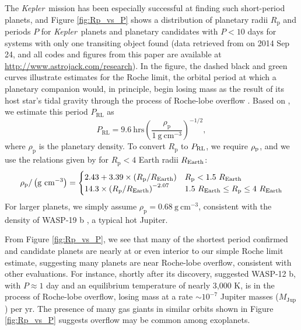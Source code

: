 \documentclass{aastex}
\newcommand{\kepler}{{\it Kepler}}
\begin{document}
The \kepler\ mission has been especially successful at finding such short-period planets, and Figure \ref{fig:Rp_vs_P} shows a distribution of planetary radii $R_\mathrm{p}$ and periods $P$ for \kepler\ planets and planetary candidates with $P < 10$ days for systems with only one transiting object found (data retrieved from  on 2014 Sep 24, and all codes and figures from this paper are available at \url{http://www.astrojack.com/research}). In the figure, the dashed black and green curves illustrate estimates for the Roche limit, the orbital period at which a planetary companion would, in principle, begin losing mass as the result of its host star's tidal gravity through the process of Roche-lobe overflow \citep[e.g.][]{1971ARA&A...9..183P}. Based on \citet{2013ApJ...773L..15R}, we estimate this period $P_\mathrm{RL}$ as 
\begin{equation}
P_\mathrm{RL} = 9.6\ \mathrm{hrs} \left(\frac{\rho_\mathrm{p}}{1\ \mathrm{g\ cm^{-3}}}\right)^{-1/2},
\label{eqn:P_L}
\end{equation}
where $\rho_\mathrm{p}$ is the planetary density. To convert $R_\mathrm{p}$ to $P_{\rm RL}$, we require $\rho_{\rm p}$, and we use the relations given by \citet{2014ApJ...783L...6W} for $R_\mathrm{p} < 4$ Earth radii $R_{\rm Earth}$:
\begin{align}
\rho_{\rm p} /\left( \mathrm{g\ cm^{-3}} \right) = 
\begin{cases} 
2.43 + 3.39 \times \left( R_{\rm p}/R_{\rm Earth} \right) & R_{\rm p} < 1.5\ R_{\rm Earth} \\ 
14.3 \times \left( R_{\rm p}/R_{\rm Earth} \right)^{-2.07} & 1.5\ R_{\rm Earth} \le R_{\rm p} \le 4\ R_{\rm Earth}
\end{cases}
\end{align}
For larger planets, we simply assume $\rho_\mathrm{p} = 0.68\ \mathrm{g\ cm^{-3}}$, consistent with the density of WASP-19 b \citep{2010ApJ...708..224H}, a typical hot Jupiter. 

From Figure \ref{fig:Rp_vs_P}, we see that many of the shortest period confirmed and candidate planets are nearly at or even interior to our simple Roche limit estimate, suggesting many planets are near Roche-lobe overflow, consistent with other evaluations. For instance, shortly after its discovery, \citet{2010Natur.463.1054L} suggested WASP-12 b, with $P \approx 1$ day and an equilibrium temperature of nearly 3,000 K, is in the process of Roche-lobe overflow, losing mass at a rate $\sim 10^{-7}$ Jupiter masses ($M_\mathrm{Jup}$) per yr. The presence of many gas giants in similar orbits shown in Figure \ref{fig:Rp_vs_P} suggests overflow may be common among exoplanets.
\end{document}
